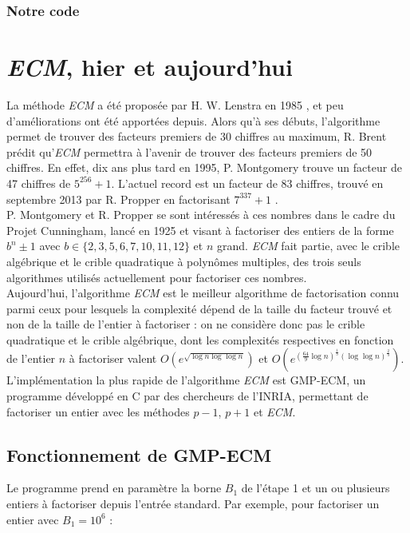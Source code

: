 \documentclass[11pt,a4paper]{article}
\begin{document}
\subsubsection{Notre code}


\section{\textit{ECM}, hier et aujourd'hui}
La méthode \textit{ECM} a été proposée par H. W. Lenstra en 1985 \cite{lenstra}, et peu d'améliorations ont été apportées depuis. Alors qu'à ses débuts, l'algorithme permet de trouver des facteurs premiers de 30 chiffres au maximum, R. Brent prédit qu'\textit{ECM} permettra à l'avenir de trouver des facteurs premiers de 50 chiffres. En effet, dix ans plus tard en 1995, P. Montgomery trouve un facteur de 47 chiffres de $5^{256} +1$. L'actuel record est un facteur de 83 chiffres, trouvé en septembre 2013 par R. Propper en factorisant $7^{337}+1$ \cite{records_ecm}. \\

P. Montgomery et R. Propper se sont intéressés à ces nombres dans le cadre du Projet Cunningham, lancé en 1925 et visant à factoriser des entiers de la forme $b^n \pm 1$ avec $b \in \{2, 3, 5, 6, 7, 10, 11, 12\}$ et $n$ grand. \textit{ECM} fait partie, avec le crible algébrique et le crible quadratique à polynômes multiples, des trois seuls algorithmes utilisés actuellement pour factoriser ces nombres. \\

Aujourd'hui, l'algorithme \textit{ECM} est le meilleur algorithme de factorisation connu parmi ceux pour lesquels la complexité dépend de la taille du facteur trouvé et non de la taille de l'entier à factoriser : on ne considère donc pas le crible quadratique et le crible algébrique, dont les complexités respectives en fonction de l'entier $n$ à factoriser valent $O\left(e^{\sqrt{\log n\log\log n}}\right)$ et $O\left(e^{(\frac{64}{9}\log n)^{\frac{1}{3}}(\log\log n)^{\frac{2}{3}}}\right)$. \\

L'implémentation la plus rapide de l'algorithme \textit{ECM} est \textsf{GMP-ECM}, un programme développé en C par des chercheurs de l'INRIA, permettant de factoriser un entier avec les méthodes $p-1$, $p+1$ et \textit{ECM}.

\subsection{Fonctionnement de \textsf{GMP-ECM}}
Le programme prend en paramètre la borne $B_1$ de l'étape 1 et un ou plusieurs entiers à factoriser depuis   l'entrée standard. Par exemple, pour factoriser un entier avec $B_1 = 10^6$ :
\end{document}
